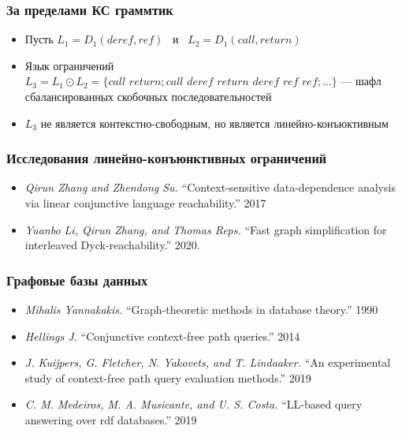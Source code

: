 \documentclass{beamer}
\begin{document}
\begin{frame}[fragile]

  \frametitle{За пределами КС граммтик}
  \begin{itemize}
      \item Пусть $L_1 = D_1(\textit{deref}, \textit{ref}) $  \ и \ $ L_2 = D_1(\textit{call}, \textit{return})$
      \item Язык ограничений $L_3 = L_1 \odot L_2 = \{\textit{call return}; \textit{call deref return deref ref ref};  \dots\}$ --- шафл сбалансированных скобочных последовательностей
      \item $L_3$ не является контекстно-свободным, но является линейно-конъюктивным
    \end{itemize}

\end{frame}

\begin{frame}[fragile]

  \frametitle{Исследования линейно-конъюнктивных ограничений}
  \begin{itemize}
      \item \emph{Qirun Zhang and Zhendong Su.} ``Context-sensitive data-dependence analysis via linear conjunctive language reachability.'' 2017
      \item \emph{Yuanbo Li, Qirun Zhang, and Thomas Reps.} ``Fast graph simplification for interleaved Dyck-reachability.'' 2020.
    \end{itemize}

\end{frame}


\begin{frame}[fragile]

  \frametitle{Графовые базы данных}
  \begin{itemize}
    \item \emph{Mihalis Yannakakis.} ``Graph-theoretic methods in database theory.'' 1990
    \item \emph{Hellings J.} ``Conjunctive context-free path queries.'' 2014
    \item \emph{J. Kuijpers, G. Fletcher, N. Yakovets, and T. Lindaaker.} ``An experimental
study of context-free path query evaluation methods.'' 2019
    \item \emph{C. M. Medeiros, M. A. Musicante, and U. S. Costa.} ``LL-based query answering
over rdf databases.'' 2019
  \end{itemize}
\end{frame}
\end{document}
